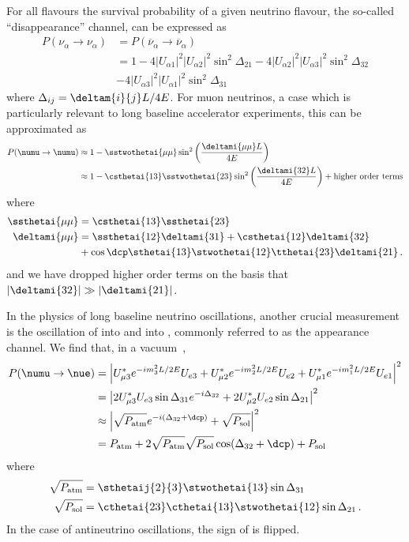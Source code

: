 For all flavours the survival probability of a given neutrino flavour, the so-called ``disappearance'' channel, can be expressed as~\cite{Nunokawa_2008}
\begin{align}
  P(\nu_{\alpha} \rightarrow \nu_{\alpha}) &= P(\overline{\nu}_{\alpha} \rightarrow \overline{\nu}_{\alpha})\\
  &= 1 - 4|U_{\alpha 1}|^{2} |U_{\alpha 2}|^{2} \sin^{2} \Delta_{21} - 4 |U_{\alpha 2}|^{2} |U_{\alpha 3}|^{2} \sin^{2}\Delta_{32} \\ &- 4 |U_{\alpha 3}|^{2} |U_{\alpha 1}|^{2} \sin^{2} \Delta_{31}
\end{align}
where $\Delta_{ij}=\deltam{i}{j}L/4E$.
For muon neutrinos, a case which is particularly relevant to long baseline accelerator experiments, this can be approximated as~\cite{pdg2018}
\begin{align}
  P(\numu \rightarrow \numu) &\approx 1 - \sstwothetai{\mu\mu} \sin^{2}\left( \frac{\deltami{\mu\mu}L}{4E} \right) \\
  \label{eq:numuSurvival}
  &\approx 1-\csthetai{13}\sstwothetai{23}\sin^{2}\left( \frac{\deltami{32}L}{4E} \right) + \text{higher order terms}
\end{align}
where
\begin{align}
  \ssthetai{\mu\mu} &= \csthetai{13}\ssthetai{23} \\
  \deltami{\mu\mu}  &= \ssthetai{12}\deltami{31}+\csthetai{12}\deltami{32} \\
  &+\cos\dcp\sthetai{13}\stwothetai{12}\tthetai{23}\deltami{21} \, .
\end{align}
and we have dropped higher order terms on the basis that $|\deltami{32}| \gg |\deltami{21}|$.

In the physics of long baseline neutrino oscillations, another crucial measurement is the oscillation of \numu into \nue and \anumu into \anue, commonly referred to as the appearance channel.
We find that, in a vacuum~\cite{Nunokawa_2008},
\begin{align}
  P(\numu \rightarrow \nue) &= \left| U^{*}_{\mu 3} e^{-im_{3}^{2}L/2E} U_{e3} + U^{*}_{\mu 2} e^{-im_{2}^{2}L/2E} U_{e2} + U^{*}_{\mu 1}e^{-im_{1}^{2}L/2E}U_{e1} \right|^{2} \\
  &= \left| 2U_{\mu 3}^{*}U_{e3} \sin \Delta_{31} e^{-i \Delta_{32}} + 2U^{*}_{\mu 2}U_{e2} \sin \Delta_{21} \right|^{2} \\
  & \approx \left| \sqrt{P_{\text{atm}}} e^{-i(\Delta_{32}+\dcp)} + \sqrt{P_{\text{sol}}} \right|^{2} \\
  &= P_{\text{atm}} + 2 \sqrt{P_{\text{atm}}} \sqrt{P_{\text{sol}}} \cos(\Delta_{32}+\dcp) + P_{\text{sol}}
  \label{eq:threeNuApp}
\end{align}
where
\begin{align}
  \sqrt{P_{\text{atm}}} &= \sthetaij{2}{3} \stwothetai{13} \sin\Delta_{31} \\
  \sqrt{P_{\text{sol}}} &= \cthetai{23} \cthetai{13} \stwothetai{12} \sin\Delta_{21} \, .
\end{align}
In the case of antineutrino oscillations, the sign of \dcp is flipped.

